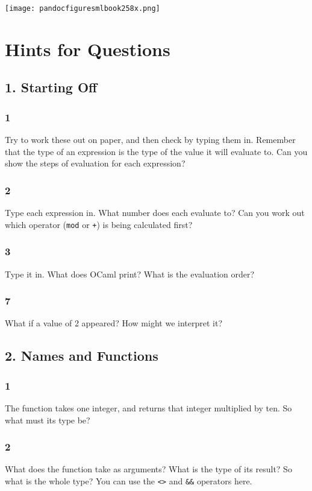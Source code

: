 \documentclass[]{book}
\begin{document}
\medskip
\begin{center}
\noindent\texttt{[image: pandocfiguresmlbook258x.png]}
\end{center}
\medskip


\cleardoublepage
\flushbottom
\chapter{Hints for Questions}

\section*{1. Starting Off}
\subsection*{1}
Try to work these out on paper, and then check by typing them in. Remember that the type of an expression is the type of the value it will evaluate to. Can you show the steps of evaluation for each expression?

\subsection*{2}
Type each expression in. What number does each evaluate to? Can you work out which operator (\texttt{mod} or \texttt{+}) is being calculated first?

\subsection*{3}
Type it in. What does OCaml print? What is the evaluation order?

\subsection*{7}
What if a value of 2 appeared? How might we interpret it?

\section*{2. Names and Functions}
\subsection*{1}
The function takes one integer, and returns that integer multiplied by ten. So what must its type be?
\subsection*{2}
What does the function take as arguments? What is the type of its result? So what is the whole type? You can use the \texttt{<>} and \texttt{\&\&} operators here.
\end{document}
